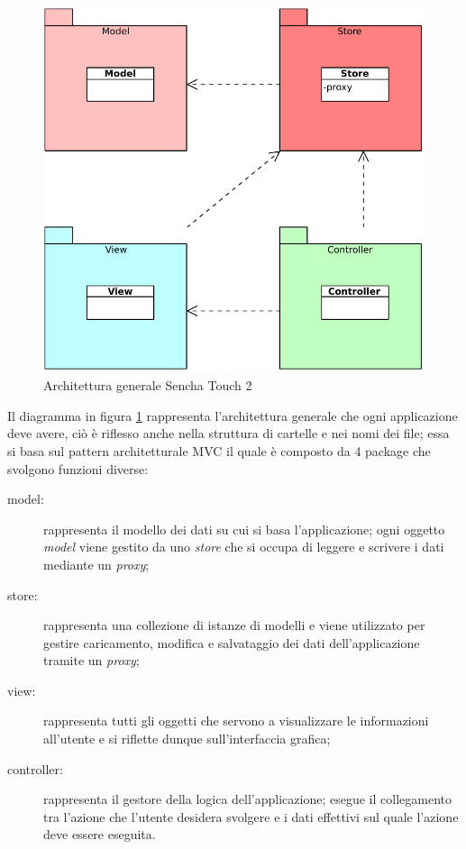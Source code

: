 \begin{figure}[htb]
\centering
\includegraphics[scale=0.6]{gfx/class/Sencha_Touch_2.pdf}
\caption{Architettura generale Sencha Touch 2}
\label{fig:architettura Sencha}
\end{figure}
Il diagramma in figura \ref{fig:architettura Sencha} rappresenta l'architettura generale che ogni applicazione deve avere, ciò è riflesso anche nella struttura di cartelle e nei nomi dei file; essa si basa sul pattern architetturale \ac{MVC} il quale è composto da 4 package che svolgono funzioni diverse:
\begin{description}
\item[model:] rappresenta il modello dei dati su cui si basa l'applicazione; ogni oggetto \emph{model} viene gestito da uno \emph{store} che si occupa di leggere e scrivere i dati mediante un \emph{proxy};
\item[store:] rappresenta una collezione di istanze di modelli e viene utilizzato per gestire caricamento, modifica e salvataggio dei dati dell'applicazione tramite un \emph{proxy};
\item[view:] rappresenta tutti gli oggetti che servono a visualizzare le informazioni all'utente e si riflette dunque sull'interfaccia grafica;
\item[controller:] rappresenta il gestore della logica dell'applicazione; esegue il collegamento tra l'azione che l'utente desidera svolgere e i dati effettivi sul quale l'azione deve essere eseguita.
\end{description}

